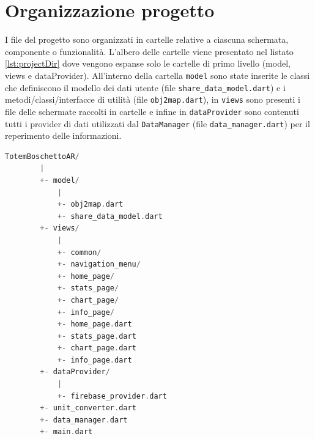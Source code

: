 \section{Organizzazione progetto}
I file del progetto sono organizzati in cartelle relative a ciascuna schermata, componente o funzionalità. L'albero delle cartelle viene presentato nel listato \ref{lst:projectDir} dove vengono espanse solo le cartelle di primo livello (model, views e dataProvider). All'interno della cartella \texttt{model} sono state inserite le classi che definiscono il modello dei dati utente (file \texttt{share\_data\_model.dart}) e i metodi/classi/interfacce di utilità (file \texttt{obj2map.dart}), in \texttt{views} sono presenti i file delle schermate raccolti in cartelle e infine in \texttt{dataProvider} sono contenuti tutti i provider di dati utilizzati dal \texttt{DataManager} (file \texttt{data\_manager.dart}) per il reperimento delle informazioni.

\begin{lstlisting}[language=C, caption={Albero della directory del progetto TotemBoschettoAR}, label={lst:projectDir}]
    TotemBoschettoAR/
        |
        +- model/
            |
            +- obj2map.dart
            +- share_data_model.dart
        +- views/
            |
            +- common/
            +- navigation_menu/
            +- home_page/
            +- stats_page/
            +- chart_page/
            +- info_page/
            +- home_page.dart
            +- stats_page.dart
            +- chart_page.dart
            +- info_page.dart
        +- dataProvider/
            |
            +- firebase_provider.dart
        +- unit_converter.dart
        +- data_manager.dart
        +- main.dart
\end{lstlisting}

